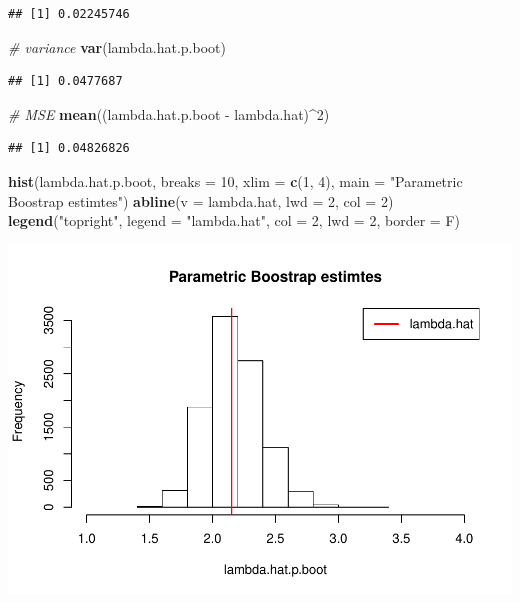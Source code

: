 \documentclass[]{article}
\newenvironment{Shaded}{\begin{snugshade}}{\end{snugshade}}
\newcommand{\KeywordTok}[1]{\textcolor[rgb]{0.13,0.29,0.53}{\textbf{{#1}}}}
\newcommand{\DataTypeTok}[1]{\textcolor[rgb]{0.13,0.29,0.53}{{#1}}}
\newcommand{\DecValTok}[1]{\textcolor[rgb]{0.00,0.00,0.81}{{#1}}}
\newcommand{\StringTok}[1]{\textcolor[rgb]{0.31,0.60,0.02}{{#1}}}
\newcommand{\CommentTok}[1]{\textcolor[rgb]{0.56,0.35,0.01}{\textit{{#1}}}}
\newcommand{\NormalTok}[1]{{#1}}
\begin{document}
\begin{verbatim}
## [1] 0.02245746
\end{verbatim}

\begin{Shaded}
\begin{Highlighting}[]
\CommentTok{# variance}
\KeywordTok{var}\NormalTok{(lambda.hat.p.boot)}
\end{Highlighting}
\end{Shaded}

\begin{verbatim}
## [1] 0.0477687
\end{verbatim}

\begin{Shaded}
\begin{Highlighting}[]
\CommentTok{# MSE}
\KeywordTok{mean}\NormalTok{((lambda.hat.p.boot -}\StringTok{ }\NormalTok{lambda.hat)^}\DecValTok{2}\NormalTok{)}
\end{Highlighting}
\end{Shaded}

\begin{verbatim}
## [1] 0.04826826
\end{verbatim}

\begin{Shaded}
\begin{Highlighting}[]
\KeywordTok{hist}\NormalTok{(lambda.hat.p.boot, }\DataTypeTok{breaks =} \DecValTok{10}\NormalTok{, }\DataTypeTok{xlim =} \KeywordTok{c}\NormalTok{(}\DecValTok{1}\NormalTok{, }\DecValTok{4}\NormalTok{), }\DataTypeTok{main =} \StringTok{"Parametric Boostrap estimtes"}\NormalTok{)}
\KeywordTok{abline}\NormalTok{(}\DataTypeTok{v =} \NormalTok{lambda.hat, }\DataTypeTok{lwd =} \DecValTok{2}\NormalTok{, }\DataTypeTok{col =} \DecValTok{2}\NormalTok{)}
\KeywordTok{legend}\NormalTok{(}\StringTok{"topright"}\NormalTok{, }\DataTypeTok{legend =} \StringTok{"lambda.hat"}\NormalTok{, }\DataTypeTok{col =} \DecValTok{2}\NormalTok{, }\DataTypeTok{lwd =} \DecValTok{2}\NormalTok{, }\DataTypeTok{border =} \NormalTok{F)}
\end{Highlighting}
\end{Shaded}

\includegraphics{Stats406Lab11_files/figure-latex/unnamed-chunk-5-1.pdf}
\end{document}

